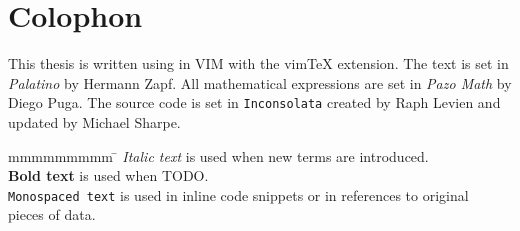 
\vspace*{\fill}

\section*{Colophon}

This thesis is written using \LaTeXe{} in VIM with the vim\TeX{} extension. The
text is set in \textit{Palatino} by Hermann Zapf. All mathematical expressions
are set in \textit{Pazo Math} by Diego Puga. The source code is set in
\texttt{Inconsolata} created by Raph Levien and updated by Michael
Sharpe.

\begin{tabbing}
  mmmmmmmmm     \= \kill
  \textit{Italic text}     \> is used when new terms are introduced.\\
  \textbf{Bold text}       \> is used when TODO.\\
  \texttt{Monospaced text} \> is used in inline code snippets or in references to original\\
                           \> pieces of data.
\end{tabbing}

